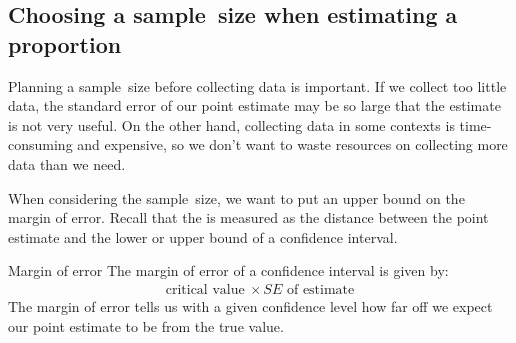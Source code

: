 
\newpage
\subsection{Choosing a sample~size when estimating a proportion}
\label{moeproportion}

Planning a sample~size before collecting data is important. If we collect too little data, the standard error of our point estimate may be so large that the estimate is not very useful. On the other hand, collecting data in some contexts is time-consuming and expensive, so we don't want to waste resources on collecting more data than we need.

When considering the sample~size, we want to put an upper bound on the margin of error. Recall that the  is measured as the distance between the point estimate and the lower or upper bound of a confidence interval.  

\begin{onebox}{Margin of error}
The margin of error of a confidence interval is given by: 
\begin{align*}
\text{critical value} \ \times SE \text{ of estimate} 
\end{align*}
The margin of error tells us with a given confidence level how far off we expect our point estimate to be from the true value.
\end{onebox}


